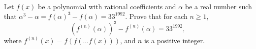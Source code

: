 Let $f(x)$ be a polynomial with rational coefficients and $\alpha$ be a real number such that $\alpha^3 - \alpha = f(\alpha)^3 - f(\alpha) = 33^{1992}$. Prove that for each $n \geq 1$,
\[ (f^{(n)}(\alpha))^3 - f^{(n)}(\alpha) = 33^{1992}, \]
where $f^{(n)}(x) = f(f(\dots f(x)))$, and $n$ is a positive integer.
